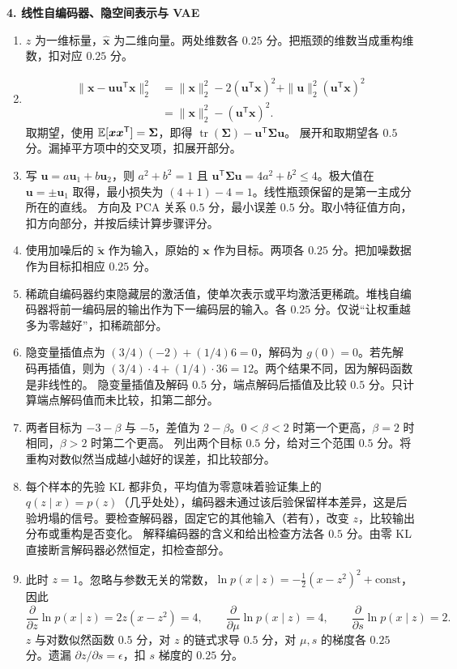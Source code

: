 \noindent\textbf{4. 线性自编码器、隐空间表示与 VAE}

\begin{enumerate}[label=(\arabic*)]
\item $z$ 为一维标量，$\widehat{\bm{x}}$ 为二维向量。两处维数各 $0.25$ 分。把瓶颈的维数当成重构维数，扣对应 $0.25$ 分。
\item
\begin{align*}
\|\bm{x}-\bm{u}\bm{u}^{\mathsf T}\bm{x}\|_2^2
&=\|\bm{x}\|_2^2-2(\bm{u}^{\mathsf T}\bm{x})^2
+\|\bm{u}\|_2^2(\bm{u}^{\mathsf T}\bm{x})^2\\
&=\|\bm{x}\|_2^2-(\bm{u}^{\mathsf T}\bm{x})^2.
\end{align*}
取期望，使用 $\mathbb{E}[\bm{x}\bm{x}^{\mathsf T}]=\bm{\Sigma}$，即得 $\operatorname{tr}(\bm{\Sigma})-\bm{u}^{\mathsf T}\bm{\Sigma}\bm{u}$。
展开和取期望各 $0.5$ 分。漏掉平方项中的交叉项，扣展开部分。
\item 写 $\bm{u}=a\bm{u}_1+b\bm{u}_2$，则 $a^2+b^2=1$ 且 $\bm{u}^{\mathsf T}\bm{\Sigma}\bm{u}=4a^2+b^2\le4$。极大值在 $\bm{u}=\pm\bm{u}_1$ 取得，最小损失为 $(4+1)-4=1$。线性瓶颈保留的是第一主成分所在的直线。
方向及 PCA 关系 $0.5$ 分，最小误差 $0.5$ 分。取小特征值方向，扣方向部分，并按后续计算步骤评分。
\item 使用加噪后的 $\widetilde{\bm{x}}$ 作为输入，原始的 $\bm{x}$ 作为目标。两项各 $0.25$ 分。把加噪数据作为目标扣相应 $0.25$ 分。
\item 稀疏自编码器约束隐藏层的激活值，使单次表示或平均激活更稀疏。堆栈自编码器将前一编码层的输出作为下一编码层的输入。各 $0.25$ 分。仅说“让权重越多为零越好”，扣稀疏部分。
\item 隐变量插值点为 $(3/4)(-2)+(1/4)6=0$，解码为 $g(0)=0$。若先解码再插值，则为 $(3/4)\cdot4+(1/4)\cdot36=12$。两个结果不同，因为解码函数是非线性的。
隐变量插值及解码 $0.5$ 分，端点解码后插值及比较 $0.5$ 分。只计算端点解码值而未比较，扣第二部分。
\item 两者目标为 $-3-\beta$ 与 $-5$，差值为 $2-\beta$。$0<\beta<2$ 时第一个更高，$\beta=2$ 时相同，$\beta>2$ 时第二个更高。
列出两个目标 $0.5$ 分，给对三个范围 $0.5$ 分。将重构对数似然当成越小越好的误差，扣比较部分。
\item 每个样本的先验 KL 都非负，平均值为零意味着验证集上的 $q(z\mid x)=p(z)$（几乎处处），编码器未通过该后验保留样本差异，这是后验坍塌的信号。要检查解码器，固定它的其他输入（若有），改变 $z$，比较输出分布或重构是否变化。
解释编码器的含义和给出检查方法各 $0.5$ 分。由零 KL 直接断言解码器必然恒定，扣检查部分。
\item 此时 $z=1$。忽略与参数无关的常数，$\ln p(x\mid z)=-\tfrac12(x-z^2)^2+\mathrm{const}$，因此
\[
\frac{\partial}{\partial z}\ln p(x\mid z)=2z(x-z^2)=4,
\qquad \frac{\partial}{\partial\mu}\ln p(x\mid z)=4,
\qquad \frac{\partial}{\partial s}\ln p(x\mid z)=2.
\]
$z$ 与对数似然函数 $0.5$ 分，对 $z$ 的链式求导 $0.5$ 分，对 $\mu,s$ 的梯度各 $0.25$ 分。遗漏 $\partial z/\partial s=\epsilon$，扣 $s$ 梯度的 $0.25$ 分。
\end{enumerate}

